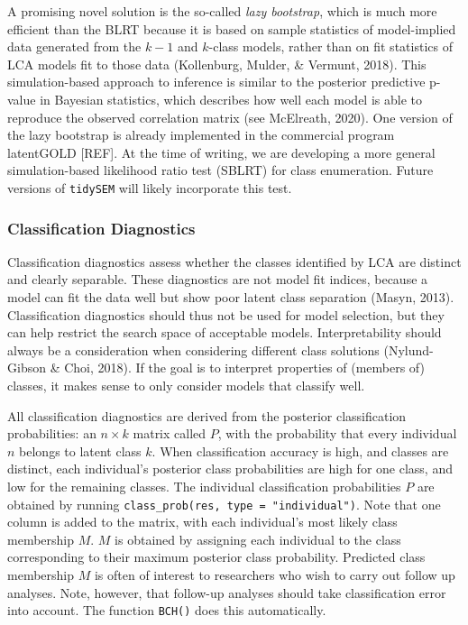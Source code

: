 \documentclass[
  ,man,floatsintext]{apa6}
\begin{document}
A promising novel solution is the so-called \emph{lazy bootstrap},
which is much more efficient than the BLRT because it is based on sample statistics of model-implied data generated from the \(k-1\) and \(k\)-class models,
rather than on fit statistics of LCA models fit to those data (Kollenburg, Mulder, \& Vermunt, 2018).
This simulation-based approach to inference is similar to the posterior predictive p-value in Bayesian statistics,
which describes how well each model is able to reproduce the observed correlation matrix (see McElreath, 2020).
One version of the lazy bootstrap is already implemented in the commercial program latentGOLD {[}REF{]}.
At the time of writing, we are developing a more general simulation-based likelihood ratio test (SBLRT) for class enumeration.
Future versions of \texttt{tidySEM} will likely incorporate this test.

\hypertarget{classification-diagnostics}{%
\subsubsection{Classification Diagnostics}\label{classification-diagnostics}}

Classification diagnostics assess whether the classes identified by LCA are distinct and clearly separable.
These diagnostics are not model fit indices,
because a model can fit the data well but show poor latent class separation (Masyn, 2013).
Classification diagnostics should thus not be used for model selection, but they can help restrict the search space of acceptable models.
Interpretability should always be a consideration when considering
different class solutions (Nylund-Gibson \& Choi, 2018).
If the goal is to interpret properties of (members of) classes,
it makes sense to only consider models that classify well.

All classification diagnostics are derived from the posterior classification probabilities: an \(n \times k\) matrix called \(P\), with the probability that every individual \(n\) belongs to latent class \(k\).
When classification accuracy is high, and classes are distinct,
each individual's posterior class probabilities are high for one class, and low for the remaining classes.
The individual classification probabilities \(P\) are obtained by running \texttt{class\_prob(res,\ type\ =\ "individual")}.
Note that one column is added to the matrix, with each individual's most likely class membership \(M\).
\(M\) is obtained by assigning each individual to the class corresponding to their maximum posterior class probability.
Predicted class membership \(M\) is often of interest to researchers who wish to carry out follow up analyses.
Note, however, that follow-up analyses should take classification error into account.
The function \texttt{BCH()} does this automatically.
\end{document}
